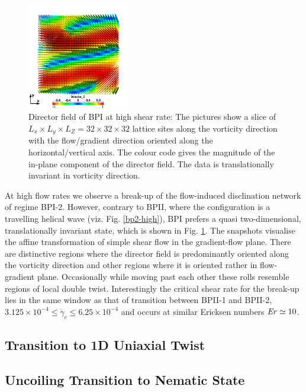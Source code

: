 \documentclass[aps,pre,reprint,superscriptaddress, twocolumn]{revtex4}
\newcommand{\e}[1]{\times10^{#1}}
\newcommand{\gd}{\dot{\gamma}}
\begin{document}
\begin{figure}[htpb]
\includegraphics[width=0.4\textwidth]{dir3d-z-302k_run916.png}
\caption{Director field of BPI at high shear rate: The pictures show a slice 
of $L_x\times L_y \times L_Z= 32\times32\times 32$ lattice sites along the vorticity direction 
with the flow/gradient direction oriented along the horizontal/vertical axis. 
The colour code gives the magnitude of the in-plane component of the director field. 
The data is translationally invariant in vorticity direction.}
\label{bp1-high}
\end{figure}
 
At high flow rates we observe a break-up of the flow-induced 
disclination network of regime BPI-2. However, 
contrary to BPII, where the configuration is a travelling helical 
wave (viz. Fig. \ref{bp2-high}), BPI prefers a quasi 
two-dimensional, translationally invariant state, which is shown in 
Fig. \ref{bp1-high}. The snapshots visualise the affine 
transformation of simple shear flow in the gradient-flow plane.
There are distinctive regions where the director field is 
predominantly oriented along the vorticity direction and 
other regions where it is oriented rather in flow-gradient plane. 
Occasionally while moving past each other these rolls resemble 
regions of local double twist.
Interestingly the critical shear rate for the break-up lies in the same 
window as that of transition between BPII-1 and BPII-2, 
 $3.125\e{-4}\le\gd_c\le 6.25\e{-4}$ and occurs at similar 
Ericksen numbers ${\it Er}\simeq 10$.

\subsection{Transition to 1D Uniaxial Twist}



\subsection{Uncoiling Transition to Nematic State} 
\end{document}
